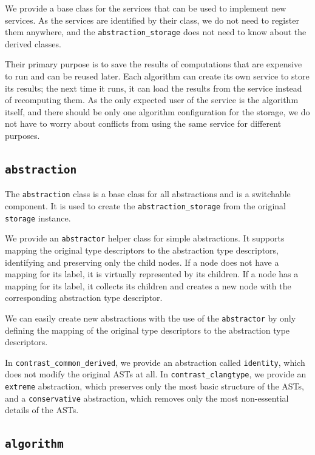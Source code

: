 We provide a base class for the services that can be used to implement new services.
As the services are identified by their class, we do not need to register them anywhere, and the \texttt{abstraction\_storage} does not need to know about the derived classes.

Their primary purpose is to save the results of computations that are expensive to run and can be reused later.
Each algorithm can create its own service to store its results; the next time it runs, it can load the results from the service instead of recomputing them.
As the only expected user of the service is the algorithm itself, and there should be only one algorithm configuration for the storage, we do not have to worry about conflicts from using the same service for different purposes.

\subsection{\texttt{abstraction}}\label{sec:abstraction}

The \texttt{abstraction} class is a base class for all abstractions and is a switchable component.
It is used to create the \texttt{abstraction\_storage} from the original \texttt{storage} instance.

We provide an \texttt{abstractor} helper class for simple abstractions.
It supports mapping the original type descriptors to the abstraction type descriptors, identifying and preserving only the child nodes.
If a node does not have a mapping for its label, it is virtually represented by its children.
If a node has a mapping for its label, it collects its children and creates a new node with the corresponding abstraction type descriptor.

We can easily create new abstractions with the use of the \texttt{abstractor} by only defining the mapping of the original type descriptors to the abstraction type descriptors.

In \texttt{contrast\_common\_derived}, we provide an abstraction called \texttt{identity}, which does not modify the original ASTs at all.
In \texttt{contrast\_clangtype}, we provide an \texttt{extreme} abstraction, which preserves only the most basic structure of the ASTs, and a \texttt{conservative} abstraction, which removes only the most non-essential details of the ASTs.

\subsection{\texttt{algorithm}}

